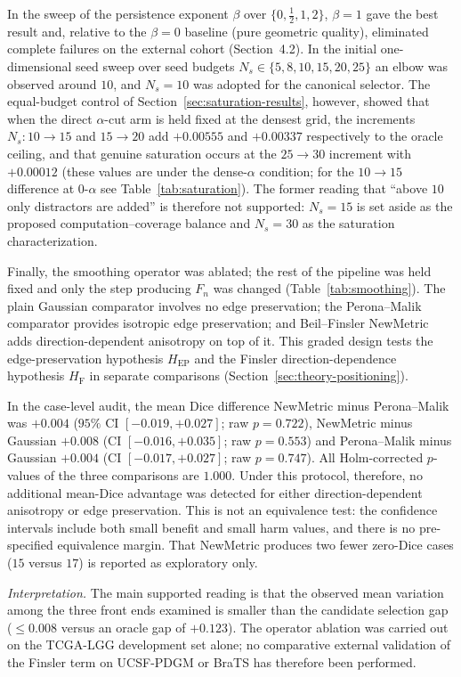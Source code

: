 \documentclass[11pt,a4paper]{article}
\begin{document}
In the sweep of the persistence exponent $\beta$ over $\{0, \tfrac12, 1, 2\}$,
$\beta{=}1$ gave the best result and, relative to the $\beta{=}0$ baseline (pure
geometric quality), eliminated complete failures on the external cohort
(Section~4.2). In the initial one-dimensional seed sweep over seed budgets
$N_s\in\{5,8,10,15,20,25\}$ an elbow was observed around $10$, and $N_s=10$ was
adopted for the canonical selector. The equal-budget control of
Section~\ref{sec:saturation-results}, however, showed that when the direct
$\alpha$-cut arm is held fixed at the densest grid, the increments $N_s:10\to15$
and $15\to20$ add $+0.00555$ and $+0.00337$ respectively to the oracle ceiling, and
that genuine saturation occurs at the $25\to30$ increment with $+0.00012$ (these
values are under the dense-$\alpha$ condition; for the $10\to15$ difference at
$0$-$\alpha$ see Table~\ref{tab:saturation}). The former reading that ``above $10$
only distractors are added'' is therefore not supported: $N_s=15$ is set aside as
the proposed computation--coverage balance and $N_s=30$ as the saturation
characterization.

Finally, the smoothing operator was ablated; the rest of the pipeline was held
fixed and only the step producing $F_n$ was changed
(Table~\ref{tab:smoothing}). The plain Gaussian comparator involves no edge
preservation; the Perona--Malik comparator provides isotropic edge preservation;
and Beil--Finsler NewMetric adds direction-dependent anisotropy on top of it. This
graded design tests the edge-preservation hypothesis $H_{\mathrm{EP}}$ and the
Finsler direction-dependence hypothesis $H_{\mathrm{F}}$ in separate comparisons
(Section~\ref{sec:theory-positioning}).

In the case-level audit, the mean Dice difference NewMetric minus Perona--Malik was
$+0.004$ ($95\%$ CI $[-0.019,+0.027]$; raw $p{=}0.722$), NewMetric minus Gaussian
$+0.008$ (CI $[-0.016,+0.035]$; raw $p{=}0.553$) and Perona--Malik minus Gaussian
$+0.004$ (CI $[-0.017,+0.027]$; raw $p{=}0.747$). All Holm-corrected $p$-values of
the three comparisons are $1.000$. Under this protocol, therefore, no additional
mean-Dice advantage was detected for either direction-dependent anisotropy or edge
preservation. This is not an equivalence test: the confidence intervals include
both small benefit and small harm values, and there is no pre-specified equivalence
margin. That NewMetric produces two fewer zero-Dice cases ($15$ versus $17$) is
reported as exploratory only.

\emph{Interpretation.} The main supported reading is that the observed mean
variation among the three front ends examined is smaller than the candidate
selection gap ($\le0.008$ versus an oracle gap of $+0.123$). The operator ablation
was carried out on the TCGA-LGG development set alone; no comparative external
validation of the Finsler term on UCSF-PDGM or BraTS has therefore been performed.
\end{document}
